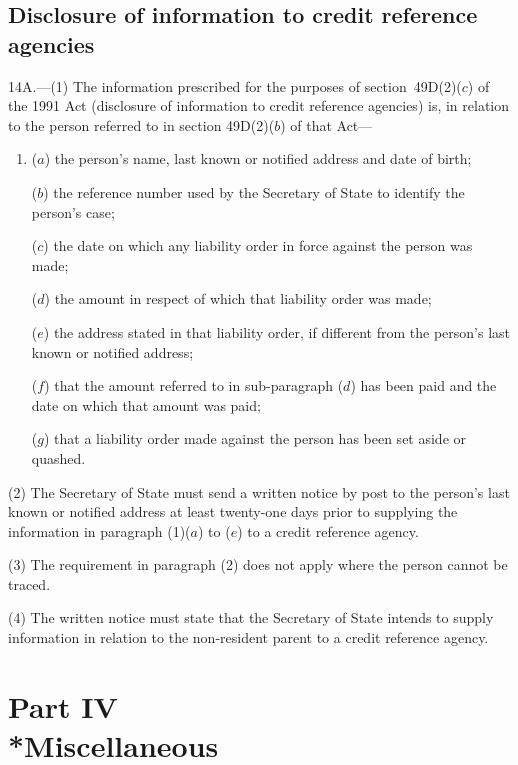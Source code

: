 \documentclass[12pt,a4paper]{article}
\begin{document}
\subsection[14A. Disclosure of information to credit reference agencies]{Disclosure of information to credit reference agencies}

14A.—(1) The information prescribed for the purposes of section~49D(2)($c$)  of the 1991 Act (disclosure of information to credit reference agencies) is, in relation to the person referred to in section 49D(2)($b$)  of that Act—
\begin{enumerate}\item[]
($a$) the person’s name, last known or notified address and date of birth;

($b$) the reference number used by the Secretary of State to identify the person’s case;

($c$) the date on which any liability order in force against the person was made;

($d$) the amount in respect of which that liability order was made;

($e$) the address stated in that liability order, if different from the person’s last known or notified address;

($f$) that the amount referred to in sub-paragraph ($d$)  has been paid and the date on which that amount was paid;

($g$) that a liability order made against the person has been set aside or quashed.
\end{enumerate}

(2) The Secretary of State must send a written notice by post to the person’s last known or notified address at least twenty-one days prior to supplying the information in paragraph (1)($a$)  to ($e$)  to a credit reference agency.

(3) The requirement in paragraph (2) does not apply where the person cannot be traced.

(4) The written notice must state that the Secretary of State intends to supply information in relation to the non-resident parent to a credit reference agency.


\section[Part IV --- Miscellaneous]{Part IV\\*Miscellaneous}
\end{document}
